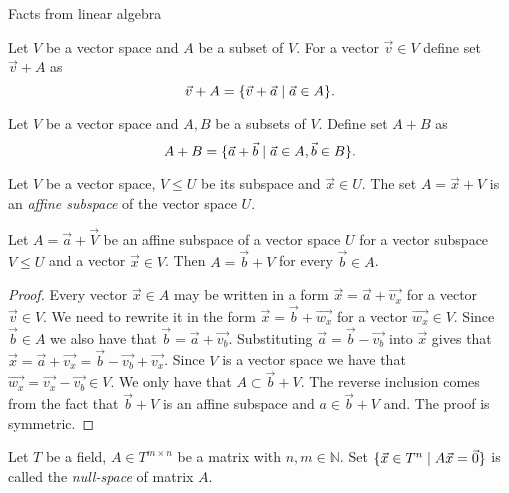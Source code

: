 \begin{chapter}{Facts from linear algebra}
\label{appendix-linear-algebra}
\begin{definition}
Let $V$ be a vector space and $A$ be a subset of $V$. For a vector $\vec{v} \in V$ define set $\vec{v} + A$ as
\[ \vec{v} + A = \{ \vec{v} + \vec{a} \mid \vec{a} \in A \} \text{.} \] 
\end{definition}

\begin{definition}
Let $V$ be a vector space and $A, B$ be a subsets of $V$. Define set $A + B$ as
\[ A + B = \{ \vec{a} + \vec{b} \mid \vec{a} \in A, \vec{b} \in B \} \text{.} \] 
\end{definition}

\begin{definition}
\label{definition-affine-subspace}
Let $V$ be a vector space, $V \leq U$ be its subspace and $\vec{x} \in U$. The set $A = \vec{x} + V$ is an \emph{affine subspace} of the vector space $U$.
\end{definition}

\begin{lemma}
\label{lemma-affine-subspace-equality}
Let $A = \vec{a} + \vec{V}$ be an affine subspace of a vector space $U$ for a vector subspace $V \leq U$ and a vector $\vec{x} \in V$. Then $A = \vec{b} + V$ for every $\vec{b} \in A$.
\end{lemma}
\begin{proof}
Every vector $\vec{x} \in A$ may be written in a form $\vec{x} = \vec{a} + \vec{v_x}$ for a vector $\vec{v} \in V$. We need to rewrite it in the form $\vec{x} = \vec{b} + \vec{w_x}$ for a vector $\vec{w_x} \in V$. Since $\vec{b} \in A$ we also have that $\vec{b} = \vec{a} + \vec{v_b}$. Substituting $\vec{a} = \vec{b} - \vec{v_b}$ into $\vec{x}$ gives that $\vec{x} = \vec{a} + \vec{v_x} = \vec{b} - \vec{v_b} + \vec{v_x}$. Since $V$ is a vector space we have that $\vec{w_x} = \vec{v_x} - \vec{v_b} \in V$. We only have that $A \subset \vec{b} + V$. The reverse inclusion comes from the fact that $\vec{b} + V$ is an affine subspace and $a \in \vec{b} + V$ and. The proof is symmetric.
\end{proof}

\begin{definition}
Let $T$ be a field, $A \in T ^ {m \times n}$ be a matrix with $n, m \in \mathbb{N}$. Set $\{ \vec{x} \in T^{n} \mid A\vec{x} = \vec{0} \}$ is called the \emph{null-space} of matrix $A$.
\end{definition}


\end{chapter}
